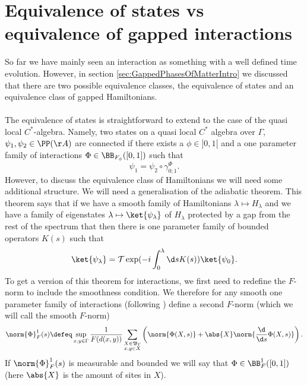 \section{Equivalence of states vs equivalence of gapped interactions}
So far we have mainly seen an interaction as something with a well defined time evolution. However, in section \ref{sec:GappedPhasesOfMatterIntro} we discussed that there are two possible equivalence classes, the equivalence of states and an equivalence class of gapped Hamiltonians.
\\\\
The equivalence of states is straightforward to extend to the case of the quasi local $C^*$-algebra. Namely, two states on a quasi local $C^*$ algebra over $\Gamma$, $\psi_1,\psi_2\in\PP(\AA)$ are connected if there exists a $\phi\in]0,1[$ and a one parameter family of interactions $\Phi\in\BB_{F_\phi}([0,1])$ such that
\begin{equation}
	\psi_1=\psi_2\circ\gamma^\Phi_{0;1}.
\end{equation}
However, to discuss the equivalence class of Hamiltonians we will need some additional structure. We will need a generalisation of the adiabatic theorem. This theorem says that if we have a smooth family of Hamiltonians $\lambda\mapsto H_\lambda$ and we have a family of eigenstates $\lambda\mapsto\ket{\psi_\lambda}$ of $H_\lambda$ protected by a gap from the rest of the spectrum that then there is one parameter family of bounded operators $K(s)$ such that
\begin{equation}
	\ket{\psi_\lambda}=\mathcal{T}\exp(-i\int_0^\lambda\d s K(s))\ket{\psi_0}.
\end{equation}
To get a version of this theorem for interactions, we first need to redefine the $F$-norm to include the smoothness condition. We therefore for any smooth one parameter family of interactions (following \cite{nachtergaele2019quasi}) define a second $F$-norm (which we will call the smooth $F$-norm)
\begin{equation}
	\norm{\Phi}_{F}^1 (s)\defeq \sup_{x,y\in \Gamma} \frac{1}{F(d(x,y))}\sum_{\substack{X\in\mathfrak{B}_\Gamma \\ x,y\in X}}\left(\norm{\Phi(X,s)}+\abs{X}\norm{\frac{\d}{\d s}\Phi(X,s)}\right).
\end{equation}
If $\norm{\Phi}_{F}^1 (s)$ is measurable and bounded we will say that $\Phi\in\BB^1_F([0,1])$ (here $\abs{X}$ is the amount of sites in $X$).
